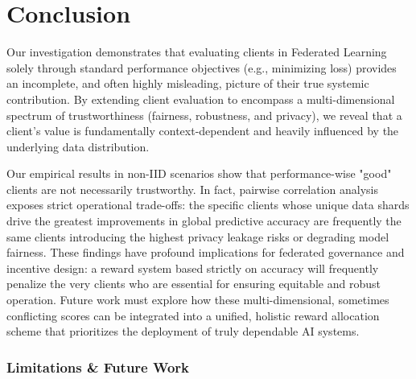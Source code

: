 \documentclass[acmsmall]{acmart}
\begin{document}
\section{Conclusion}
\label{sec:con}

Our investigation demonstrates that evaluating clients in Federated Learning solely through standard performance objectives (e.g., minimizing loss) provides an incomplete, and often highly misleading, picture of their true systemic contribution. By extending client evaluation to encompass a multi-dimensional spectrum of trustworthiness (fairness, robustness, and privacy), we reveal that a client's value is fundamentally context-dependent and heavily influenced by the underlying data distribution. 

Our empirical results in non-IID scenarios show that performance-wise "good" clients are not necessarily trustworthy. In fact, pairwise correlation analysis exposes strict operational trade-offs: the specific clients whose unique data shards drive the greatest improvements in global predictive accuracy are frequently the same clients introducing the highest privacy leakage risks or degrading model fairness. These findings have profound implications for federated governance and incentive design: a reward system based strictly on accuracy will frequently penalize the very clients who are essential for ensuring equitable and robust operation. Future work must explore how these multi-dimensional, sometimes conflicting scores can be integrated into a unified, holistic reward allocation scheme that prioritizes the deployment of truly dependable AI systems.

\subsubsection*{Limitations \& Future Work}
\end{document}
